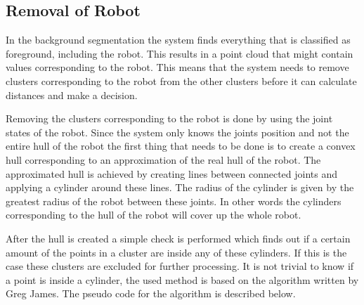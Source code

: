 \subsection{Removal of Robot}

In the background segmentation the system finds everything that is classified as foreground, including the robot.
This results in a point cloud that might contain values corresponding to the robot. 
This means that the system needs to remove clusters corresponding to the robot from the other clusters before it can calculate distances and make a decision.

Removing the clusters corresponding to the robot is done by using the joint states of the robot.
Since the system only knows the joints position and not the entire hull of the robot the first thing that needs to be done is to create a convex hull corresponding to an approximation of the real hull of the robot.
The approximated hull is achieved by creating lines between connected joints and applying a cylinder around these lines.
The radius of the cylinder is given by the greatest radius of the robot between these joints. 
In other words the cylinders corresponding to the hull of the robot will cover up the whole robot.

After the hull is created a simple check is performed which finds out if a certain amount of the points in a cluster are inside any of these cylinders.
If this is the case these clusters are excluded for further processing.
It is not trivial to know if a point is inside a cylinder, the used method is based on the algorithm written by Greg James. \cite{cylinder} The pseudo code for the algorithm is described below.

